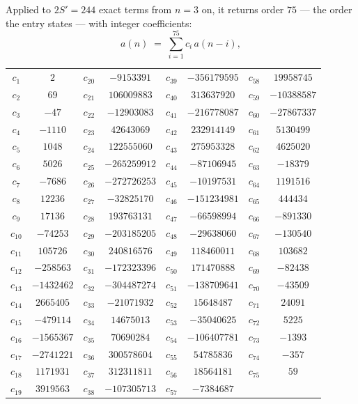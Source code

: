 \documentclass[11pt,a4paper]{article}
\theoremstyle{plain}
\theoremstyle{definition}
\begin{document}
Applied to $2S'=244$ exact terms from $n=3$ on, it returns order $75$ --- the
order the entry states --- with integer coefficients:
\[
a(n)\;=\;\sum_{i=1}^{75}c_i\,a(n-i),
\]
\begin{center}\small
\begin{tabular}{cccccccc}
$c_{1}$ & $2$ & $c_{20}$ & $-9153391$ & $c_{39}$ & $-356179595$ & $c_{58}$ & $19958745$ \\
$c_{2}$ & $69$ & $c_{21}$ & $106009883$ & $c_{40}$ & $313637920$ & $c_{59}$ & $-10388587$ \\
$c_{3}$ & $-47$ & $c_{22}$ & $-12903083$ & $c_{41}$ & $-216778087$ & $c_{60}$ & $-27867337$ \\
$c_{4}$ & $-1110$ & $c_{23}$ & $42643069$ & $c_{42}$ & $232914149$ & $c_{61}$ & $5130499$ \\
$c_{5}$ & $1048$ & $c_{24}$ & $122555060$ & $c_{43}$ & $275953328$ & $c_{62}$ & $4625020$ \\
$c_{6}$ & $5026$ & $c_{25}$ & $-265259912$ & $c_{44}$ & $-87106945$ & $c_{63}$ & $-18379$ \\
$c_{7}$ & $-7686$ & $c_{26}$ & $-272726253$ & $c_{45}$ & $-10197531$ & $c_{64}$ & $1191516$ \\
$c_{8}$ & $12236$ & $c_{27}$ & $-32825170$ & $c_{46}$ & $-151234981$ & $c_{65}$ & $444434$ \\
$c_{9}$ & $17136$ & $c_{28}$ & $193763131$ & $c_{47}$ & $-66598994$ & $c_{66}$ & $-891330$ \\
$c_{10}$ & $-74253$ & $c_{29}$ & $-203185205$ & $c_{48}$ & $-29638060$ & $c_{67}$ & $-130540$ \\
$c_{11}$ & $105726$ & $c_{30}$ & $240816576$ & $c_{49}$ & $118460011$ & $c_{68}$ & $103682$ \\
$c_{12}$ & $-258563$ & $c_{31}$ & $-172323396$ & $c_{50}$ & $171470888$ & $c_{69}$ & $-82438$ \\
$c_{13}$ & $-1432462$ & $c_{32}$ & $-304487274$ & $c_{51}$ & $-138709641$ & $c_{70}$ & $-43509$ \\
$c_{14}$ & $2665405$ & $c_{33}$ & $-21071932$ & $c_{52}$ & $15648487$ & $c_{71}$ & $24091$ \\
$c_{15}$ & $-479114$ & $c_{34}$ & $14675013$ & $c_{53}$ & $-35040625$ & $c_{72}$ & $5225$ \\
$c_{16}$ & $-1565367$ & $c_{35}$ & $70690284$ & $c_{54}$ & $-106407781$ & $c_{73}$ & $-1393$ \\
$c_{17}$ & $-2741221$ & $c_{36}$ & $300578604$ & $c_{55}$ & $54785836$ & $c_{74}$ & $-357$ \\
$c_{18}$ & $1171931$ & $c_{37}$ & $312311811$ & $c_{56}$ & $18564181$ & $c_{75}$ & $59$ \\
$c_{19}$ & $3919563$ & $c_{38}$ & $-107305713$ & $c_{57}$ & $-7384687$ &  &  \\
\end{tabular}
\end{center}
\end{document}
